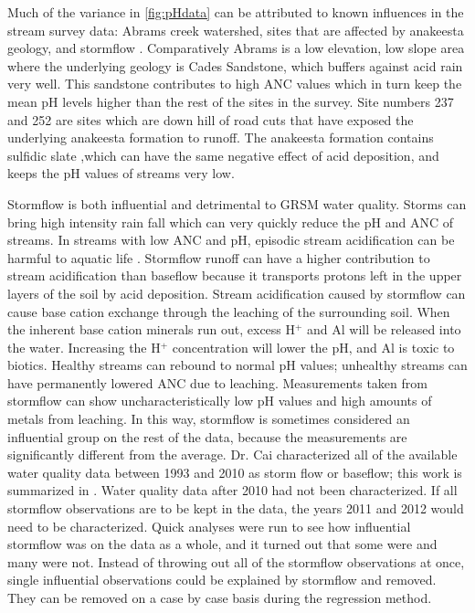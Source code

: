 Much of the variance in \autoref{fig:pHdata} can be attributed to known influences in the stream survey data: Abrams creek watershed, sites that are affected by anakeesta geology, and stormflow \citep{neff2012influence}.  
Comparatively Abrams is a low elevation, low slope area where the underlying geology is Cades Sandstone, which buffers against acid rain very well. 
This sandstone contributes to high ANC values which in turn keep the mean pH levels higher than the rest of the sites in the survey. Site numbers 237 and 252 are sites which are down hill of road cuts that have exposed the underlying anakeesta formation to runoff.  
The anakeesta formation contains sulfidic slate ,which can have the same negative effect of acid deposition,  and keeps the pH values of streams very low.

Stormflow is both influential and detrimental  to GRSM water quality. 
Storms can bring high intensity rain fall which can very quickly reduce the pH and ANC of streams. 
In streams with low ANC and pH, episodic stream acidification can be harmful to aquatic life \citep{neff2009physiological}. 
Stormflow runoff can have a higher contribution to stream acidification than baseflow because it transports protons left in the upper layers of the soil by acid deposition. 
Stream acidification caused by stormflow can cause base cation exchange through the leaching of the surrounding soil. When the inherent base cation minerals run out, excess H$^+$ and Al will be released into the water. 
Increasing the H$^+$ concentration will lower the pH, and Al is toxic to biotics. 
Healthy streams can rebound to normal pH values; unhealthy streams can have permanently lowered ANC due to leaching.  
Measurements taken from stormflow can show uncharacteristically low pH values and high amounts of metals from leaching. 
In this way, stormflow is sometimes considered an influential group on the rest of the data, because the measurements are significantly different from the average. 
Dr. Cai characterized all of the available water quality data between 1993 and 2010 as storm flow or baseflow; this work is summarized in \citet{cai2012}. 
Water quality data after 2010 had not been characterized. If all stormflow observations are to be kept in the data, the years 2011 and 2012 would need to be characterized. 
Quick analyses were run to see how influential stormflow was on the data as a whole, and it turned out that some were and many were not. Instead of throwing out all of the stormflow observations at once, single influential observations could be explained by stormflow and removed. 
They can be removed on a case by case basis during the regression method.

